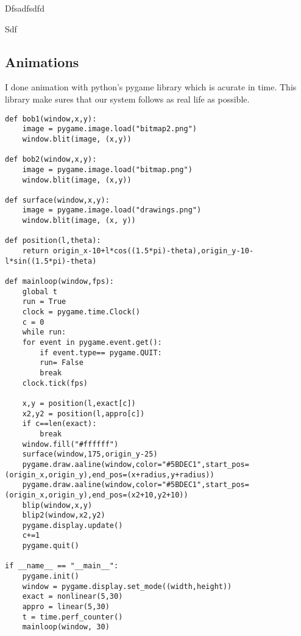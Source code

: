 \documentclass[11pt]{article}
\begin{document}
Dfsadfsdfd


Sdf
\subsection{Animations}
\label{sec:org749048b}
I done animation with python's pygame library which is acurate in time. This library make sures that our system follows as real life as possible.

\begin{verbatim}
def bob1(window,x,y):
    image = pygame.image.load("bitmap2.png")
    window.blit(image, (x,y))

def bob2(window,x,y):
    image = pygame.image.load("bitmap.png")
    window.blit(image, (x,y))

def surface(window,x,y):
    image = pygame.image.load("drawings.png")
    window.blit(image, (x, y))

def position(l,theta):
    return origin_x-10+l*cos((1.5*pi)-theta),origin_y-10-l*sin((1.5*pi)-theta)

def mainloop(window,fps):
    global t
    run = True
    clock = pygame.time.Clock()
    c = 0
    while run:
	for event in pygame.event.get():
	    if event.type== pygame.QUIT:
		run= False
		break
	clock.tick(fps)

	x,y = position(l,exact[c])
	x2,y2 = position(l,appro[c])
	if c==len(exact):
	    break
	window.fill("#ffffff")
	surface(window,175,origin_y-25)
	pygame.draw.aaline(window,color="#5BDEC1",start_pos=(origin_x,origin_y),end_pos=(x+radius,y+radius))
	pygame.draw.aaline(window,color="#5BDEC1",start_pos=(origin_x,origin_y),end_pos=(x2+10,y2+10))
	blip(window,x,y)
	blip2(window,x2,y2)
	pygame.display.update()
	c+=1
    pygame.quit()

if __name__ == "__main__":
    pygame.init()
    window = pygame.display.set_mode((width,height))
    exact = nonlinear(5,30)
    appro = linear(5,30)
    t = time.perf_counter()
    mainloop(window, 30)

\end{verbatim}
\end{document}
